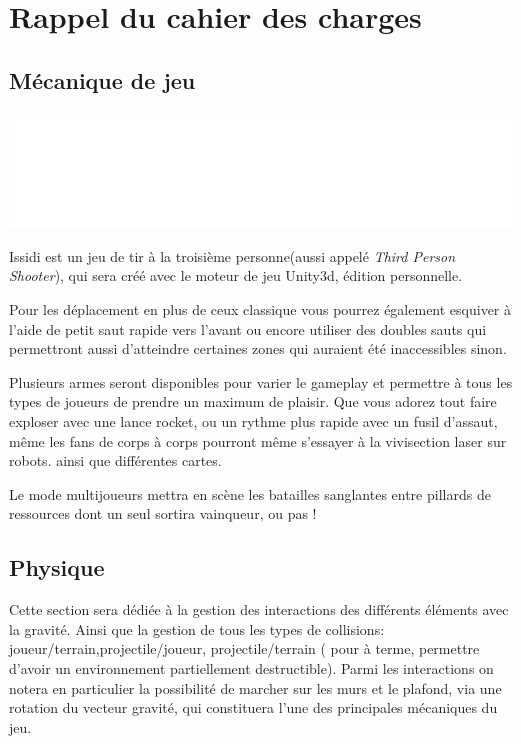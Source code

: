 ﻿\documentclass[12pt]{article}
\begin{document}
\newpage\section{Rappel du cahier des charges}

\subsection{Mécanique de jeu}
\centerline{\includegraphics[scale=0.2]{latex_sa_pue.png}}

 Issidi est un jeu de tir à la troisième personne(aussi appelé \emph{Third Person Shooter}),
qui sera créé avec le moteur de jeu Unity3d, édition personnelle.

Pour les déplacement en plus de ceux classique vous pourrez également esquiver à l'aide de petit saut rapide vers 
l'avant ou encore utiliser des doubles sauts qui permettront aussi d'atteindre certaines zones qui auraient
 été inaccessibles sinon.

Plusieurs armes seront disponibles pour varier le gameplay et permettre à tous les types de joueurs de prendre
 un maximum de plaisir. Que vous adorez tout faire exploser avec une lance rocket, ou un rythme plus rapide avec 
un fusil d'assaut, même les fans de corps à corps pourront même s'essayer à la vivisection laser sur robots. 
ainsi que différentes cartes.

Le mode multijoueurs mettra en scène les batailles sanglantes entre pillards de ressources dont un seul 
sortira vainqueur, ou pas !


\subsection{Physique}
Cette section sera dédiée à la gestion des interactions des différents éléments avec la gravité.
Ainsi que la gestion de tous les types de collisions: joueur/terrain,projectile/joueur, projectile/terrain ( pour à terme, permettre d'avoir un
environnement partiellement destructible). Parmi les interactions on notera en particulier la possibilité de marcher sur 
les murs et le plafond, via une rotation du vecteur gravité, qui constituera l'une des principales mécaniques du jeu.
\end{document}
